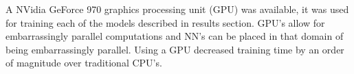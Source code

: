 A NVidia GeForce 970 graphics processing unit (GPU) was available, it was used for training each of the models described in results section. GPU's allow for embarrassingly parallel computations and NN's can be placed in that domain of being embarrassingly parallel. Using a GPU decreased training time by an order of magnitude over traditional CPU's.

